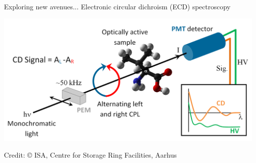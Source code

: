 \documentclass{beamer}
\begin{document}
\begin{frame}{Exploring new avenues...}
Electronic circular dichroism (ECD) spectroscopy 
\begin{center}
  \includegraphics[scale=0.25]{figures/CD.png}
\end{center}
\footnotesize{Credit: © ISA, Centre for Storage Ring Facilities, Aarhus}
\end{frame}
\end{document}
